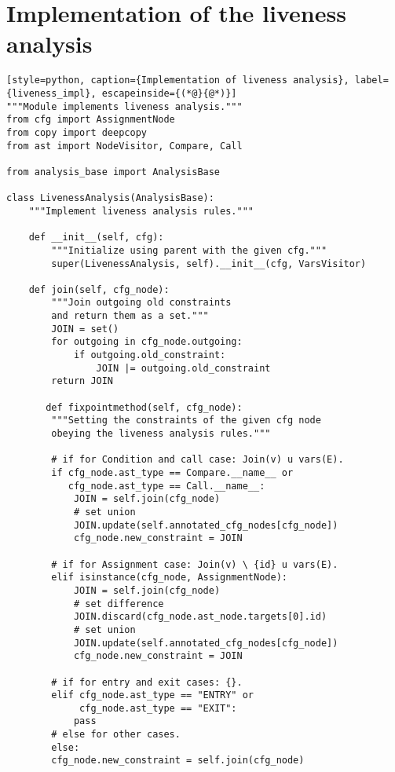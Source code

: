 \chapter{Implementation of the liveness analysis}\label{appendix:liveness}

\begin{lstlisting}[style=python, caption={Implementation of liveness analysis}, label={liveness_impl}, escapeinside={(*@}{@*)}]
"""Module implements liveness analysis."""
from cfg import AssignmentNode
from copy import deepcopy
from ast import NodeVisitor, Compare, Call

from analysis_base import AnalysisBase

class LivenessAnalysis(AnalysisBase):
    """Implement liveness analysis rules."""

    def __init__(self, cfg):
        """Initialize using parent with the given cfg."""
        super(LivenessAnalysis, self).__init__(cfg, VarsVisitor)
    
    def join(self, cfg_node):
        """Join outgoing old constraints
        and return them as a set."""
        JOIN = set()
        for outgoing in cfg_node.outgoing:
            if outgoing.old_constraint:
                JOIN |= outgoing.old_constraint
        return JOIN
    
       def fixpointmethod(self, cfg_node):
        """Setting the constraints of the given cfg node
        obeying the liveness analysis rules."""
    
        # if for Condition and call case: Join(v) u vars(E).
        if cfg_node.ast_type == Compare.__name__ or
           cfg_node.ast_type == Call.__name__:
            JOIN = self.join(cfg_node)
            # set union
            JOIN.update(self.annotated_cfg_nodes[cfg_node])  
            cfg_node.new_constraint = JOIN

        # if for Assignment case: Join(v) \ {id} u vars(E).
        elif isinstance(cfg_node, AssignmentNode): 
            JOIN = self.join(cfg_node)
            # set difference
            JOIN.discard(cfg_node.ast_node.targets[0].id)
            # set union
            JOIN.update(self.annotated_cfg_nodes[cfg_node])  
            cfg_node.new_constraint = JOIN

        # if for entry and exit cases: {}.
        elif cfg_node.ast_type == "ENTRY" or
             cfg_node.ast_type == "EXIT":
            pass
        # else for other cases.
        else:
        cfg_node.new_constraint = self.join(cfg_node)
        


\end{lstlisting}
